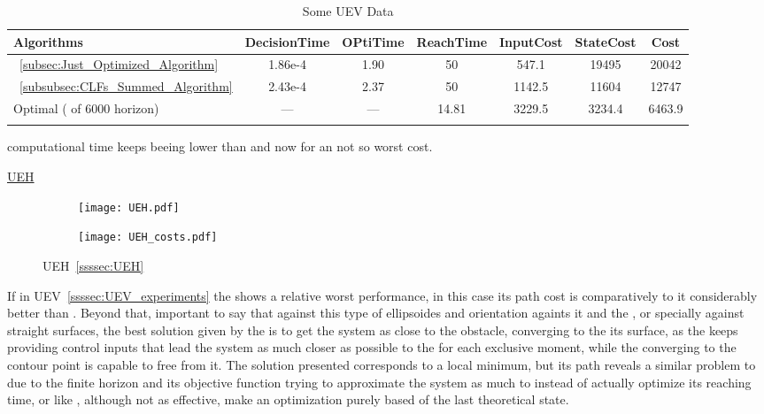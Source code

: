   \bgroup
 \begin{xltabular}{\textwidth}{|l|cccccc|}
   \toprule
   Algorithms   & DecisionTime & OPtiTime & ReachTime  & InputCost   & StateCost & Cost           \\
   \midrule
    ~\ref{subsec:Just_Optimized_Algorithm}           & 1.86e-4 & 1.90 & 50 & 547.1 & 19495 & 20042 \\
    ~\ref{subsubsec:CLFs_Summed_Algorithm}        & 2.43e-4 & 2.37 & 50 & 1142.5 & 11604 & 12747 \\
    Optimal ( of 6000 horizon)                        & ---     & ---  & 14.81  & 3229.5  & 3234.4 & 6463.9 \\
    \midrule
    \caption{Some UEV Data}
    \label{tab:Some_UEV_Data}\\
   \end{xltabular}
 \egroup


  computational time keeps beeing lower than  and now for an not so worst cost.


  \newpage %


\underline{UEH}
\label{ssssec:UEH_experiments} %

 \begin{figure}[htbp]
  \begin{subfigure}{0.5\textwidth}
    \centering
    \texttt{[image: UEH.pdf]}
  \label{fig:UEH_CostEvol}
  \end{subfigure}
  \begin{subfigure}{0.6\textwidth}
    \centering
    \texttt{[image: UEH\_costs.pdf]}
  \label{fig:UEH_trajectory}
  \end{subfigure}
  \caption{UEH~\ref{ssssec:UEH}}
\label{fig:UEHTrajectory_and_CostEvol}
\end{figure}


If in UEV~\ref{ssssec:UEV_experiments} the  shows a relative worst performance, in this case its path cost is comparatively to it considerably better than . Beyond that, important to say that against this type of ellipsoides and orientation againts it and the \txtref, or specially against straight surfaces, the best solution given by the  is to get the system as close to the obstacle, converging to the its surface, as the  keeps providing control inputs that lead the system as much closer as possible to the \txtref for each exclusive moment, while the  converging to the contour point is capable to free from it. The  solution presented corresponds to a local minimum, but its path reveals a similar problem to  due to the finite horizon and its objective function trying to approximate the system as much to \txtref instead of actually optimize its reaching time, or like , although not as effective, make an optimization purely based of the last theoretical state.  


